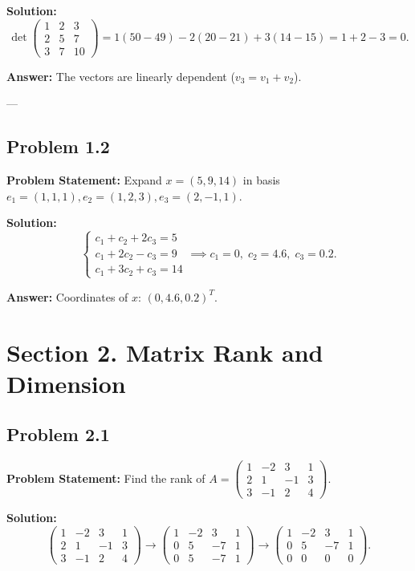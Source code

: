 \documentclass[11pt, a4paper]{article}
\begin{document}
\textbf{Solution:}
$$ \det \begin{pmatrix} 1 & 2 & 3 \\ 2 & 5 & 7 \\ 3 & 7 & 10 \end{pmatrix} = 1(50 - 49) - 2(20 - 21) + 3(14 - 15) = 1 + 2 - 3 = 0. $$

\textbf{Answer:} The vectors are linearly dependent ($v_3 = v_1 + v_2$).

---

\subsection*{Problem 1.2}
\textbf{Problem Statement:} Expand $x = (5, 9, 14)$ in basis $e_1 = (1, 1, 1), e_2 = (1, 2, 3), e_3 = (2, -1, 1)$.

\textbf{Solution:}
$$ \begin{cases} c_1 + c_2 + 2c_3 = 5 \\ c_1 + 2c_2 - c_3 = 9 \\ c_1 + 3c_2 + c_3 = 14 \end{cases} \implies c_1 = 0, \; c_2 = 4.6, \; c_3 = 0.2. $$

\textbf{Answer:} Coordinates of $x$: $(0, 4.6, 0.2)^T$.

\newpage

\section{Section 2. Matrix Rank and Dimension}

\subsection*{Problem 2.1}
\textbf{Problem Statement:} Find the rank of $A = \begin{pmatrix} 1 & -2 & 3 & 1 \\ 2 & 1 & -1 & 3 \\ 3 & -1 & 2 & 4 \end{pmatrix}$.

\textbf{Solution:}
$$ \begin{pmatrix} 1 & -2 & 3 & 1 \\ 2 & 1 & -1 & 3 \\ 3 & -1 & 2 & 4 \end{pmatrix} \to \begin{pmatrix} 1 & -2 & 3 & 1 \\ 0 & 5 & -7 & 1 \\ 0 & 5 & -7 & 1 \end{pmatrix} \to \begin{pmatrix} 1 & -2 & 3 & 1 \\ 0 & 5 & -7 & 1 \\ 0 & 0 & 0 & 0 \end{pmatrix}. $$
\end{document}
